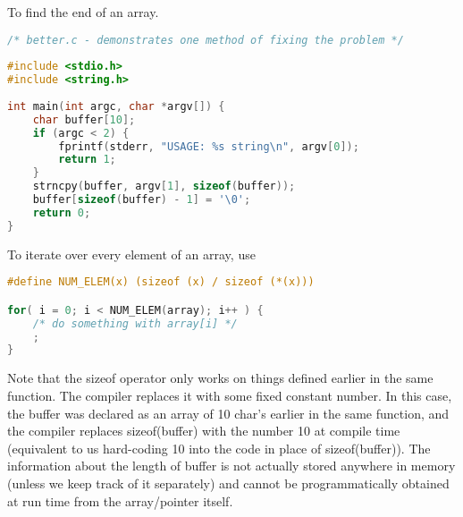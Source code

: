 To find the end of an array.
\lstset{basicstyle=\scriptsize, numbers=left, captionpos=b, tabsize=4}
\begin{lstlisting}[caption=Section \thesection listing \arabic{pntcnt},language={C},
breaklines=true,xleftmargin=15pt,label=lst:section\thesection listing\arabic{pntcnt}]
/* better.c - demonstrates one method of fixing the problem */
 
#include <stdio.h>
#include <string.h>
 
int main(int argc, char *argv[]) {
	char buffer[10];
	if (argc < 2) {
		fprintf(stderr, "USAGE: %s string\n", argv[0]);
		return 1;
	}
	strncpy(buffer, argv[1], sizeof(buffer));
	buffer[sizeof(buffer) - 1] = '\0';
	return 0;
}
\end{lstlisting}

To iterate over every element of an array, use
\lstset{basicstyle=\scriptsize, numbers=left, captionpos=b, tabsize=4}
\begin{lstlisting}[caption=Section \thesection listing \arabic{pntcnt},language={C},
breaklines=true,xleftmargin=15pt,label=lst:section\thesection listing\arabic{pntcnt}]
#define NUM_ELEM(x) (sizeof (x) / sizeof (*(x)))

for( i = 0; i < NUM_ELEM(array); i++ ) {
	/* do something with array[i] */
	;
}
\end{lstlisting}

Note that the sizeof operator only works on things defined earlier in the same
function.  The compiler replaces it with some fixed constant number.  In this
case, the buffer was declared as an array of 10 char's earlier in the same
function, and the compiler replaces sizeof(buffer) with the number 10 at
compile time (equivalent to us hard-coding 10 into the code in place of
sizeof(buffer)).  The information about the length of buffer is not actually
stored anywhere in memory (unless we keep track of it separately) and cannot be
programmatically obtained at run time from the array/pointer itself.

